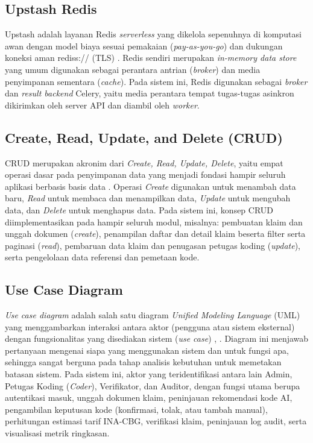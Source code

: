 \subsection{Upstash Redis}
Upstash adalah layanan Redis \textit{serverless} yang dikelola sepenuhnya di komputasi awan dengan model biaya sesuai pemakaian (\textit{pay-as-you-go}) dan dukungan koneksi aman rediss:// (TLS) \cite{29}. Redis sendiri merupakan \textit{in-memory data store} yang umum digunakan sebagai perantara antrian (\textit{broker}) dan media penyimpanan sementara (\textit{cache}). Pada sistem ini, Redis digunakan sebagai \textit{broker} dan \textit{result backend} Celery, yaitu media perantara tempat tugas-tugas asinkron dikirimkan oleh server API dan diambil oleh \textit{worker}.

\subsection{Create, Read, Update, and Delete (CRUD)}
CRUD merupakan akronim dari \textit{Create, Read, Update, Delete}, yaitu empat operasi dasar pada penyimpanan data yang menjadi fondasi hampir seluruh aplikasi berbasis basis data \cite{13}. Operasi \textit{Create} digunakan untuk menambah data baru, \textit{Read} untuk membaca dan menampilkan data, \textit{Update} untuk mengubah data, dan \textit{Delete} untuk menghapus data. Pada sistem ini, konsep CRUD diimplementasikan pada hampir seluruh modul, misalnya: pembuatan klaim dan unggah dokumen (\textit{create}), penampilan daftar dan detail klaim beserta filter serta paginasi (\textit{read}), pembaruan data klaim dan penugasan petugas koding (\textit{update}), serta pengelolaan data referensi dan pemetaan kode.

\subsection{Use Case Diagram}
\textit{Use case diagram} adalah salah satu diagram \textit{Unified Modeling Language} (UML) yang menggambarkan interaksi antara aktor (pengguna atau sistem eksternal) dengan fungsionalitas yang disediakan sistem (\textit{use case}) \cite{8}, \cite{13}. Diagram ini menjawab pertanyaan mengenai siapa yang menggunakan sistem dan untuk fungsi apa, sehingga sangat berguna pada tahap analisis kebutuhan untuk memetakan batasan sistem. Pada sistem ini, aktor yang teridentifikasi antara lain Admin, Petugas Koding (\textit{Coder}), Verifikator, dan Auditor, dengan fungsi utama berupa autentikasi masuk, unggah dokumen klaim, peninjauan rekomendasi kode AI, pengambilan keputusan kode (konfirmasi, tolak, atau tambah manual), perhitungan estimasi tarif INA-CBG, verifikasi klaim, peninjauan log audit, serta visualisasi metrik ringkasan.

